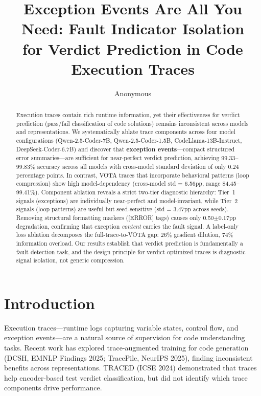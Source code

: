 \documentclass[11pt]{article}
\title{Exception Events Are All You Need: Fault Indicator Isolation\\for Verdict Prediction in Code Execution Traces}
\author{Anonymous}
\date{}
\begin{document}
\maketitle

\begin{abstract}
Execution traces contain rich runtime information, yet their effectiveness for verdict prediction (pass/fail classification of code solutions) remains inconsistent across models and representations. We systematically ablate trace components across four model configurations (Qwen-2.5-Coder-7B, Qwen-2.5-Coder-1.5B, CodeLlama-13B-Instruct, DeepSeek-Coder-6.7B) and discover that \textbf{exception events}---compact structured error summaries---are sufficient for near-perfect verdict prediction, achieving 99.33--99.83\% accuracy across all models with cross-model standard deviation of only 0.24 percentage points. In contrast, VOTA traces that incorporate behavioral patterns (loop compression) show high model-dependency (cross-model std = 6.56pp, range 84.45--99.41\%). Component ablation reveals a strict two-tier diagnostic hierarchy: Tier~1 signals (exceptions) are individually near-perfect and model-invariant, while Tier~2 signals (loop patterns) are useful but seed-sensitive (std = 3.47pp across seeds). Removing structural formatting markers ([ERROR] tags) causes only 0.50$\pm$0.17pp degradation, confirming that exception \emph{content} carries the fault signal. A label-only loss ablation decomposes the full-trace-to-VOTA gap: 26\% gradient dilution, 74\% information overload. Our results establish that verdict prediction is fundamentally a fault detection task, and the design principle for verdict-optimized traces is diagnostic signal isolation, not generic compression.
\end{abstract}

\section{Introduction}

Execution traces---runtime logs capturing variable states, control flow, and exception events---are a natural source of supervision for code understanding tasks. Recent work has explored trace-augmented training for code generation (DCSH, EMNLP Findings 2025; TracePile, NeurIPS 2025), finding inconsistent benefits across representations. TRACED (ICSE 2024) demonstrated that traces help encoder-based test verdict classification, but did not identify which trace components drive performance.
\end{document}
